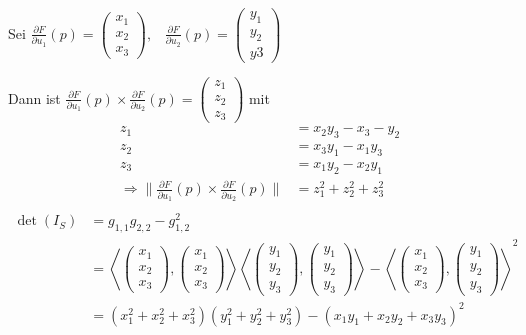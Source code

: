 \begin{beweis}
    Sei $\frac{\partial F}{\partial u_1}(p) = \begin{pmatrix}
        x_1\\ x_2 \\ x_3
    \end{pmatrix}, \;\;\; \frac{\partial F}{\partial u_2}(p) = \begin{pmatrix}
        y_1\\ y_2 \\ y3
    \end{pmatrix}$

    Dann ist $\frac{\partial F}{\partial u_1}(p) \times \frac{\partial F}{\partial u_2}(p) = \begin{pmatrix}
        z_1 \\ z_2 \\ z_3
    \end{pmatrix}$ mit
    \begin{align*}
        z_1 &= x_2 y_3 - x_3 - y_2\\
        z_2 &= x_3 y_1 - x_1 y_3\\
        z_3 &= x_1 y_2 - x_2 y_1\\
    \Rightarrow \|\frac{\partial F}{\partial u_1} (p) \times \frac{\partial F}{\partial u_2} (p)\| &= z_1^2 + z_2^2 + z_3^2\\
    \end{align*}
    \begin{align*}
        \det(I_S) &= g_{1,1} g_{2,2} - g_{1,2}^2\\
        &= \left \langle \begin{pmatrix} x_1 \\ x_2 \\ x_3 \end{pmatrix}, \begin{pmatrix} x_1 \\ x_2 \\ x_3 \end{pmatrix} \right \rangle \left \langle \begin{pmatrix} y_1 \\ y_2 \\ y_3 \end{pmatrix}, \begin{pmatrix} y_1 \\ y_2 \\ y_3 \end{pmatrix} \right \rangle - \left \langle \begin{pmatrix} x_1 \\ x_2 \\ x_3 \end{pmatrix}, \begin{pmatrix} y_1 \\ y_2 \\ y_3 \end{pmatrix} \right \rangle^2\\
        &= (x_1^2 + x_2^2 + x_3^2) (y_1^2 + y_2^2 + y_3^2) - (x_1 y_1 + x_2 y_2 + x_3 y_3)^2
    \end{align*}
\end{beweis}

